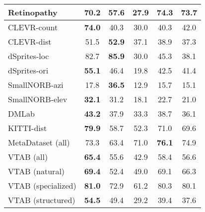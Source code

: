 \documentclass{article}
\begin{document}
\begin{table}[H]
\begin{center}
\begin{tabular}{lccccc}
Retinopathy & 70.2 & 57.6 & 27.9 &  \textbf{74.3} & 73.7\\
\midrule
CLEVR-count & \textbf{74.0} & 40.3 & 30.0 & 40.3 & 42.0\\
CLEVR-dist & 51.5 & \textbf{52.9} & 37.1 & 38.9 & 37.3\\
dSprites-loc & 82.7 & \textbf{85.9} & 30.0 & 45.3 & 38.1\\
dSprites-ori & \textbf{55.1} & 46.4 & 19.8 & 42.5 & 41.4\\
SmallNORB-azi & 17.8 & \textbf{36.5} & 12.9 & 15.7 & 15.1\\
SmallNORB-elev & \textbf{32.1} & 31.2 & 18.1 & 22.7 & 21.0\\
DMLab & \textbf{43.2} & 37.9 & 33.3 & 38.7 & 36.1\\
KITTI-dist & \textbf{79.9} & 58.7 & 52.3 & 71.0 & 69.6\\
\midrule
MetaDataset (all) & 73.3 & 63.4 & 71.0 & \textbf{76.1} & 74.9\\
VTAB (all) & \textbf{65.4} & 55.6 & 42.9 & 58.4 & 56.6\\
VTAB (natural) & \textbf{69.4} & 52.4 & 49.0 & 69.1 & 66.3\\
VTAB (specialized) & \textbf{81.0} & 72.9 & 61.2 & 80.3 & 80.1\\
VTAB (structured) & \textbf{54.5} & 49.4 & 29.2 & 39.4 & 37.6\\
\bottomrule
\end{tabular}
\label{tab:breakdown_uppercase_vs_finetuning}
\end{center}
\vskip -0.1in
\end{table}
\end{document}

